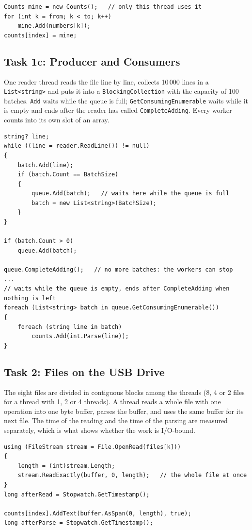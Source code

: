 \documentclass[12pt,a4paper]{article}
\begin{document}
\begin{lstlisting}[style=csharp,caption={Version 3, a counter for each thread (Task1b.cs)}]
Counts mine = new Counts();   // only this thread uses it
for (int k = from; k < to; k++)
    mine.Add(numbers[k]);
counts[index] = mine;
\end{lstlisting}

\subsection{Task 1c: Producer and Consumers}

One reader thread reads the file line by line, collects 10\,000 lines in a \texttt{List<string>} and puts it into a \texttt{BlockingCollection} with the capacity of 100 batches. \texttt{Add} waits while the queue is full; \texttt{GetConsumingEnumerable} waits while it is empty and ends after the reader has called \texttt{CompleteAdding}. Every worker counts into its own slot of an array.

\begin{lstlisting}[style=csharp,caption={Reader and workers of Task1c.cs}]
string? line;
while ((line = reader.ReadLine()) != null)
{
    batch.Add(line);
    if (batch.Count == BatchSize)
    {
        queue.Add(batch);   // waits here while the queue is full
        batch = new List<string>(BatchSize);
    }
}

if (batch.Count > 0)
    queue.Add(batch);

queue.CompleteAdding();   // no more batches: the workers can stop
...
// waits while the queue is empty, ends after CompleteAdding when nothing is left
foreach (List<string> batch in queue.GetConsumingEnumerable())
{
    foreach (string line in batch)
        counts.Add(int.Parse(line));
}
\end{lstlisting}

\subsection{Task 2: Files on the USB Drive}

The eight files are divided in contiguous blocks among the threads (8, 4 or 2 files for a thread with 1, 2 or 4 threads). A thread reads a whole file with one operation into one byte buffer, parses the buffer, and uses the same buffer for its next file. The time of the reading and the time of the parsing are measured separately, which is what shows whether the work is I/O-bound.

\begin{lstlisting}[style=csharp,caption={Reading and parsing a file in Task2.cs}]
using (FileStream stream = File.OpenRead(files[k]))
{
    length = (int)stream.Length;
    stream.ReadExactly(buffer, 0, length);   // the whole file at once
}
long afterRead = Stopwatch.GetTimestamp();

counts[index].AddText(buffer.AsSpan(0, length), true);
long afterParse = Stopwatch.GetTimestamp();
\end{lstlisting}
\end{document}
